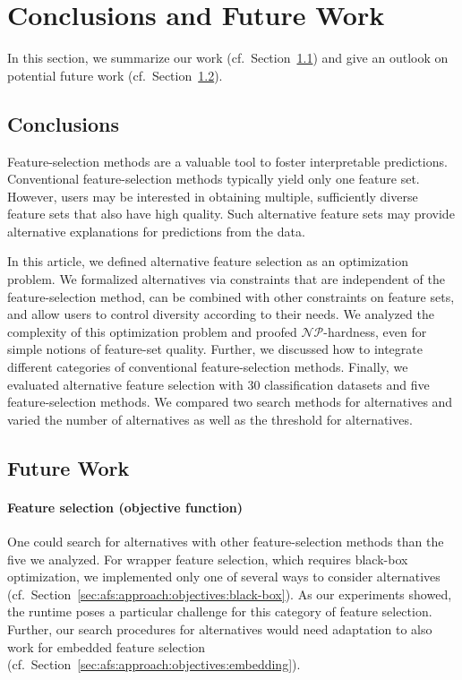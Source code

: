 \documentclass{article}
\theoremstyle{definition}
\begin{document}
\section{Conclusions and Future Work}
\label{sec:afs:conclusion}

In this section, we summarize our work (cf.~Section~\ref{sec:afs:conclusion:conclusion}) and give an outlook on potential future work (cf.~Section~\ref{sec:afs:conclusion:future-work}).

\subsection{Conclusions}
\label{sec:afs:conclusion:conclusion}

Feature-selection methods are a valuable tool to foster interpretable predictions.
Conventional feature-selection methods typically yield only one feature set.
However, users may be interested in obtaining multiple, sufficiently diverse feature sets that also have high quality.
Such alternative feature sets may provide alternative explanations for predictions from the data.

In this article, we defined alternative feature selection as an optimization problem.
We formalized alternatives via constraints that are independent of the feature-selection method, can be combined with other constraints on feature sets, and allow users to control diversity according to their needs.
We analyzed the complexity of this optimization problem and proofed $\mathcal{NP}$-hardness, even for simple notions of feature-set quality.
Further, we discussed how to integrate different categories of conventional feature-selection methods.
Finally, we evaluated alternative feature selection with 30 classification datasets and five feature-selection methods.
We compared two search methods for alternatives and varied the number of alternatives as well as the threshold for alternatives.

\subsection{Future Work}
\label{sec:afs:conclusion:future-work}

\paragraph{Feature selection (objective function)}

One could search for alternatives with other feature-selection methods than the five we analyzed.
For wrapper feature selection, which requires black-box optimization, we implemented only one of several ways to consider alternatives (cf.~Section~\ref{sec:afs:approach:objectives:black-box}).
As our experiments showed, the runtime poses a particular challenge for this category of feature selection.
Further, our search procedures for alternatives would need adaptation to also work for embedded feature selection (cf.~Section~\ref{sec:afs:approach:objectives:embedding}).
\end{document}
